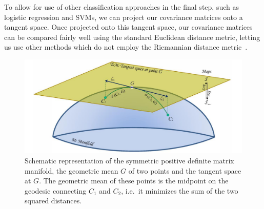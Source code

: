         To allow for use of other classification approaches in the final step, such as logistic regression and SVMs, we can project our covariance matrices onto a tangent space. Once projected onto this tangent space, our covariance matrices can be compared fairly well using the standard Euclidean distance metric, letting us use other methods which do not employ the Riemannian distance metric~\cite{congedo_riemannian_2017}.

        \begin{figure}[h]
            \centering
            \includegraphics[width=12cm]{img/riemannian-tangent-space.png}
            \caption{Schematic representation of the symmetric positive definite matrix manifold, the geometric mean $G$ of two points and the tangent space at $G$. The geometric mean of these points is the midpoint on the geodesic connecting $C_1$ and $C_2$, i.e.\ it minimizes the sum of the two squared distances.}\label{figure:tangent-space}
        \end{figure}

